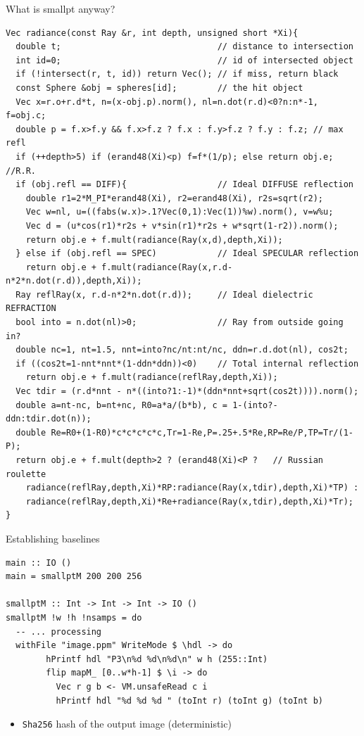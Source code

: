 \documentclass[8pt]{beamer}
\newcommand{\raw}[1]{\texttt{#1}}
\begin{document}
\begin{frame}[fragile]{What is smallpt anyway?}
\footnotesize
\begin{verbatim}
Vec radiance(const Ray &r, int depth, unsigned short *Xi){ 
  double t;                               // distance to intersection 
  int id=0;                               // id of intersected object 
  if (!intersect(r, t, id)) return Vec(); // if miss, return black 
  const Sphere &obj = spheres[id];        // the hit object 
  Vec x=r.o+r.d*t, n=(x-obj.p).norm(), nl=n.dot(r.d)<0?n:n*-1, f=obj.c; 
  double p = f.x>f.y && f.x>f.z ? f.x : f.y>f.z ? f.y : f.z; // max refl 
  if (++depth>5) if (erand48(Xi)<p) f=f*(1/p); else return obj.e; //R.R. 
  if (obj.refl == DIFF){                  // Ideal DIFFUSE reflection 
    double r1=2*M_PI*erand48(Xi), r2=erand48(Xi), r2s=sqrt(r2); 
    Vec w=nl, u=((fabs(w.x)>.1?Vec(0,1):Vec(1))%w).norm(), v=w%u; 
    Vec d = (u*cos(r1)*r2s + v*sin(r1)*r2s + w*sqrt(1-r2)).norm(); 
    return obj.e + f.mult(radiance(Ray(x,d),depth,Xi)); 
  } else if (obj.refl == SPEC)            // Ideal SPECULAR reflection 
    return obj.e + f.mult(radiance(Ray(x,r.d-n*2*n.dot(r.d)),depth,Xi)); 
  Ray reflRay(x, r.d-n*2*n.dot(r.d));     // Ideal dielectric REFRACTION 
  bool into = n.dot(nl)>0;                // Ray from outside going in? 
  double nc=1, nt=1.5, nnt=into?nc/nt:nt/nc, ddn=r.d.dot(nl), cos2t; 
  if ((cos2t=1-nnt*nnt*(1-ddn*ddn))<0)    // Total internal reflection 
    return obj.e + f.mult(radiance(reflRay,depth,Xi)); 
  Vec tdir = (r.d*nnt - n*((into?1:-1)*(ddn*nnt+sqrt(cos2t)))).norm(); 
  double a=nt-nc, b=nt+nc, R0=a*a/(b*b), c = 1-(into?-ddn:tdir.dot(n)); 
  double Re=R0+(1-R0)*c*c*c*c*c,Tr=1-Re,P=.25+.5*Re,RP=Re/P,TP=Tr/(1-P); 
  return obj.e + f.mult(depth>2 ? (erand48(Xi)<P ?   // Russian roulette 
    radiance(reflRay,depth,Xi)*RP:radiance(Ray(x,tdir),depth,Xi)*TP) : 
    radiance(reflRay,depth,Xi)*Re+radiance(Ray(x,tdir),depth,Xi)*Tr); 
} 
\end{verbatim}
\end{frame}

\begin{frame}[fragile]{Establishing baselines}
\begin{verbatim}
main :: IO ()
main = smallptM 200 200 256

smallptM :: Int -> Int -> Int -> IO ()
smallptM !w !h !nsamps = do
  -- ... processing
  withFile "image.ppm" WriteMode $ \hdl -> do
        hPrintf hdl "P3\n%d %d\n%d\n" w h (255::Int)
        flip mapM_ [0..w*h-1] $ \i -> do
          Vec r g b <- VM.unsafeRead c i
          hPrintf hdl "%d %d %d " (toInt r) (toInt g) (toInt b)
\end{verbatim}

\pause
\begin{itemize}
\item \raw{Sha256} hash of the output image (deterministic)
\end{itemize}

\end{frame}
\end{document}
